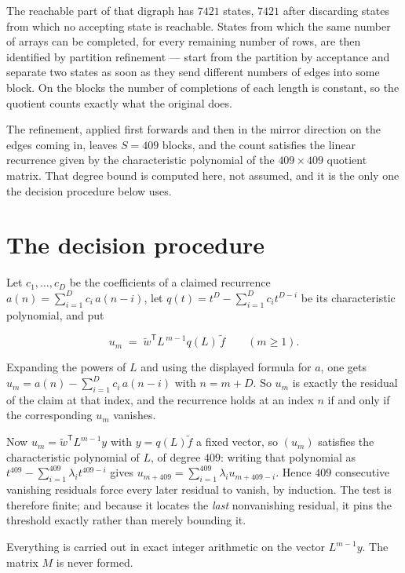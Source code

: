\documentclass[11pt]{article}
\theoremstyle{definition}
\begin{document}
The reachable part of that digraph has $7421$ states, $7421$ after discarding states from which no accepting state is reachable. States from which the same number of arrays can be completed, for every remaining number of rows, are then identified by partition refinement --- start from the partition by acceptance and separate two states as soon as they send different numbers of edges into some block. On the blocks the number of completions of each length is constant, so the quotient counts exactly what the original does.

The refinement, applied first forwards and then in the mirror direction on the edges coming in, leaves $S = 409$ blocks, and the count satisfies the linear recurrence given by the characteristic polynomial of the $409 \times 409$ quotient matrix. That degree bound is computed here, not assumed, and it is the only one the decision procedure below uses.

\section{The decision procedure}

Let $c_1,\dots,c_D$ be the coefficients of a claimed recurrence $a(n) = \sum_{i=1}^{D} c_i\,a(n-i)$, let $q(t) = t^{D} - \sum_{i=1}^{D} c_i t^{D-i}$ be its characteristic polynomial, and put

\[u_m \;=\; \tilde w^{\mathsf T} L^{\,m-1} q(L)\,\tilde f \qquad (m \ge 1).\]

Expanding the powers of $L$ and using the displayed formula for $a$, one gets $u_m = a(n) - \sum_{i=1}^{D} c_i\,a(n-i)$ with $n = m + D$. So $u_m$ is exactly the residual of the claim at that index, and the recurrence holds at an index $n$ if and only if the corresponding $u_m$ vanishes.

Now $u_m = \tilde w^{\mathsf T} L^{m-1} y$ with $y = q(L)\tilde f$ a fixed vector, so $(u_m)$ satisfies the characteristic polynomial of $L$, of degree $409$: writing that polynomial as $t^{409} - \sum_{i=1}^{409} \lambda_i t^{409-i}$ gives $u_{m+409} = \sum_{i=1}^{409} \lambda_i u_{m+409-i}$. Hence $409$ consecutive vanishing residuals force every later residual to vanish, by induction. The test is therefore finite; and because it locates the {\itshape last} nonvanishing residual, it pins the threshold exactly rather than merely bounding it.

Everything is carried out in exact integer arithmetic on the vector $L^{m-1}y$. The matrix $M$ is never formed.
\end{document}
